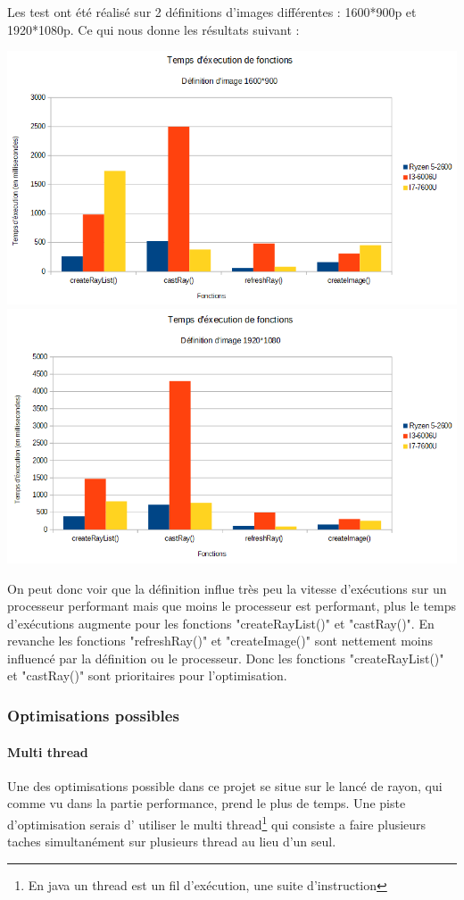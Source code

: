 \documentclass[12pt]{article}
\begin{document}
			Les test ont été réalisé sur 2 définitions d'images différentes : 1600*900p et 1920*1080p. Ce qui nous donne les résultats suivant :
			\begin{center}
			\includegraphics[scale=0.6]{./images/1600_900.png}\\
			\includegraphics[scale=0.6]{./images/1920_1080.png}
			\end{center}
			On peut donc voir que la définition influe très peu la vitesse d'exécutions sur un processeur performant mais que moins le processeur est performant, plus le temps d'exécutions augmente pour les fonctions "createRayList()" et "castRay()". En revanche les fonctions "refreshRay()" et "createImage()" sont nettement moins influencé par la définition ou le processeur. Donc les fonctions "createRayList()" et "castRay()" sont prioritaires pour l'optimisation.
			
			\subsubsection{Optimisations possibles}
				\paragraph{Multi thread}
			Une des optimisations possible dans ce projet se situe sur le lancé de rayon, qui comme vu dans la partie performance, prend le plus de temps. Une piste d'optimisation serais d' utiliser le multi thread\footnote{En java un thread est un fil d'exécution, une suite d'instruction} qui consiste a faire plusieurs taches simultanément sur plusieurs thread au lieu d'un seul.
			
\end{document}
